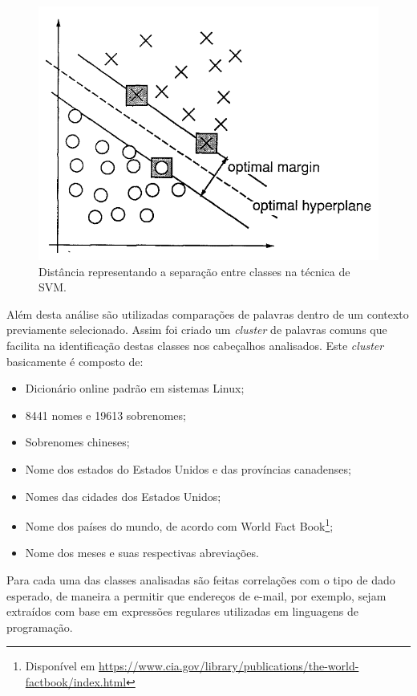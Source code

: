 \begin{figure}
    \label{fig:svm-graph}
    \centering
    \caption{Distância representando a separação entre classes na técnica de SVM.}
    \includegraphics[width=0.6\linewidth]{./assets/images/svm-graph}
\end{figure}

\begin{textedited}
Além desta análise são utilizadas comparações de palavras dentro de um contexto previamente selecionado. Assim foi criado um \textit{cluster} de palavras comuns que facilita na identificação destas classes nos cabeçalhos analisados. Este \textit{cluster} basicamente é composto de:
\end{textedited}

\begin{itemize}
    \item Dicionário online padrão em sistemas Linux;
    \item 8441 nomes e 19613 sobrenomes;
    \item Sobrenomes chineses;
    \item Nome dos estados do Estados Unidos e das províncias canadenses;
    \item Nomes das cidades dos Estados Unidos;
    \item Nome dos países do mundo, de acordo com World Fact Book\footnote{Disponível em \url{https://www.cia.gov/library/publications/the-world-factbook/index.html}};
    \item Nome dos meses e suas respectivas abreviações.
\end{itemize}

Para cada uma das classes analisadas são feitas correlações com o tipo de dado esperado, de maneira a permitir que endereços de e-mail, por exemplo, sejam extraídos com base em expressões regulares utilizadas em linguagens de programação.

